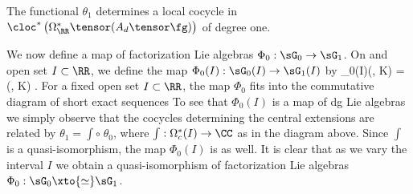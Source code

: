 The functional $\theta_1$ determines a local cocycle in $\cloc^*\left(\Omega^*_\RR \tensor (A_d \tensor \fg)\right)$ of degree one. 

\def\dR{{\rm dR}}

We now define a map of factorization Lie algebras $\Phi_0 : \sG_0 \to \sG_1$. On and open set $I \subset \RR$, we define the map $\Phi_0(I) : \sG_0(I) \to \sG_1(I)$ by
\ben
\Phi_0(I)(\varphi \alpha, \psi K) = \left(\varphi \alpha, \int \psi \cdot K\right) .
\een
For a fixed open set $I \subset \RR$, the map $\Phi_0$ fits into the commutative diagram of short exact sequences
\ben
{}
\een
To see that $\Phi_0(I)$ is a map of dg Lie algebras we simply observe that the cocycles determining the central extensions are related by $\theta_1 = \int \circ \; \theta_0$, where $\int : \Omega^*_c(I) \to \CC$ as in the diagram above. Since $\int$ is a quasi-isomorphism, the map $\Phi_0(I)$ is as well. It is clear that as we vary the interval $I$ we obtain a quasi-isomorphism of factorization Lie algebras $\Phi_0 : \sG_0 \xto{\simeq} \sG_1$. 


